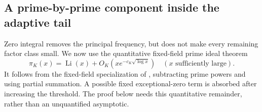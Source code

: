 \documentclass[11pt]{article}
\numberwithin{equation}{section}
\theoremstyle{definition}
\theoremstyle{remark}
\begin{document}
\subsection{A prime-by-prime component inside the adaptive tail}

Zero integral removes the principal frequency, but does not make
every remaining factor class small.
We now use the quantitative fixed-field prime ideal theorem
\begin{equation}\label{eq:quantitative-pnt}
 \pi_K(x)=\operatorname{Li}(x)
       +O_K(xe^{-c_K\sqrt{\log x}})
 \quad(x\text{ sufficiently large}).
\end{equation}
It follows from the fixed-field specialization of
\cite[Corollary~1.4]{DKN}, subtracting prime powers and using partial
summation. A possible fixed exceptional-zero term is absorbed after
increasing the threshold. The proof below needs this quantitative
remainder, rather than an unquantified asymptotic.
\end{document}

